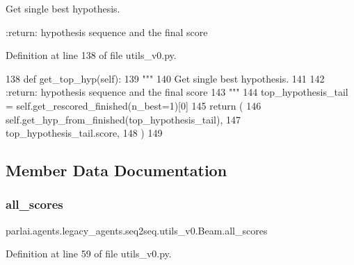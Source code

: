 \begin{DoxyVerb}Get single best hypothesis.

:return: hypothesis sequence and the final score
\end{DoxyVerb}
 

Definition at line 138 of file utils\+\_\+v0.\+py.


\begin{DoxyCode}
138     \textcolor{keyword}{def }get\_top\_hyp(self):
139         \textcolor{stringliteral}{"""}
140 \textcolor{stringliteral}{        Get single best hypothesis.}
141 \textcolor{stringliteral}{}
142 \textcolor{stringliteral}{        :return: hypothesis sequence and the final score}
143 \textcolor{stringliteral}{        """}
144         top\_hypothesis\_tail = self.get\_rescored\_finished(n\_best=1)[0]
145         \textcolor{keywordflow}{return} (
146             self.get\_hyp\_from\_finished(top\_hypothesis\_tail),
147             top\_hypothesis\_tail.score,
148         )
149 
\end{DoxyCode}


\subsection{Member Data Documentation}
\mbox{\label{classparlai_1_1agents_1_1legacy__agents_1_1seq2seq_1_1utils__v0_1_1Beam_ae8e9fc9a712aef34dc78d40faf089d79}} 
\subsubsection{\texorpdfstring{all\+\_\+scores}{all\_scores}}
{\footnotesize\ttfamily parlai.\+agents.\+legacy\+\_\+agents.\+seq2seq.\+utils\+\_\+v0.\+Beam.\+all\+\_\+scores}



Definition at line 59 of file utils\+\_\+v0.\+py.

\mbox{\label{classparlai_1_1agents_1_1legacy__agents_1_1seq2seq_1_1utils__v0_1_1Beam_aa23d688e6e9c2d6ced98d57ac1a7059c}} 
